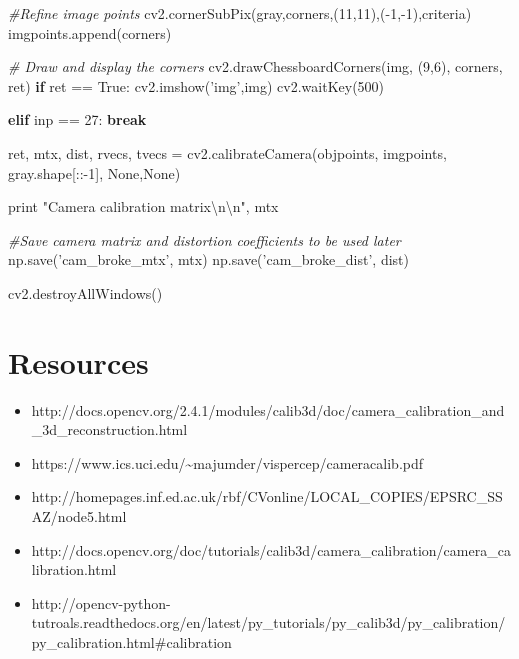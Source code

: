 \documentclass[]{article}
\newenvironment{Shaded}{}{}
\newcommand{\DecValTok}[1]{\textcolor[rgb]{0.25,0.63,0.44}{{#1}}}
\newcommand{\CharTok}[1]{\textcolor[rgb]{0.25,0.44,0.63}{{#1}}}
\newcommand{\StringTok}[1]{\textcolor[rgb]{0.25,0.44,0.63}{{#1}}}
\newcommand{\CommentTok}[1]{\textcolor[rgb]{0.38,0.63,0.69}{\textit{{#1}}}}
\newcommand{\VariableTok}[1]{\textcolor[rgb]{0.10,0.09,0.49}{{#1}}}
\newcommand{\ControlFlowTok}[1]{\textcolor[rgb]{0.00,0.44,0.13}{\textbf{{#1}}}}
\newcommand{\OperatorTok}[1]{\textcolor[rgb]{0.40,0.40,0.40}{{#1}}}
\newcommand{\BuiltInTok}[1]{{#1}}
\newcommand{\NormalTok}[1]{{#1}}
\providecommand{\tightlist}{%
  \setlength{\itemsep}{0pt}\setlength{\parskip}{0pt}}
\begin{document}
\begin{Shaded}
\begin{Highlighting}[]
            \CommentTok{#Refine image points}
            \NormalTok{cv2.cornerSubPix(gray,corners,(}\DecValTok{11}\NormalTok{,}\DecValTok{11}\NormalTok{),(}\OperatorTok{-}\DecValTok{1}\NormalTok{,}\OperatorTok{-}\DecValTok{1}\NormalTok{),criteria)}
            \NormalTok{imgpoints.append(corners)}

            \CommentTok{# Draw and display the corners}
            \NormalTok{cv2.drawChessboardCorners(img, (}\DecValTok{9}\NormalTok{,}\DecValTok{6}\NormalTok{), corners, ret)}
            \ControlFlowTok{if} \NormalTok{ret }\OperatorTok{==} \VariableTok{True}\NormalTok{:}
                \NormalTok{cv2.imshow(}\StringTok{'img'}\NormalTok{,img)}
                \NormalTok{cv2.waitKey(}\DecValTok{500}\NormalTok{)}

    \ControlFlowTok{elif} \NormalTok{inp }\OperatorTok{==} \DecValTok{27}\NormalTok{: }\ControlFlowTok{break}


\NormalTok{ret, mtx, dist, rvecs, tvecs }\OperatorTok{=} \NormalTok{cv2.calibrateCamera(objpoints,}
                                                   \NormalTok{imgpoints, gray.shape[::}\OperatorTok{-}\DecValTok{1}\NormalTok{],}
                                                   \VariableTok{None}\NormalTok{,}\VariableTok{None}\NormalTok{)}



\BuiltInTok{print} \StringTok{"Camera calibration matrix}\CharTok{\textbackslash{}n\textbackslash{}n}\StringTok{"}\NormalTok{, mtx}

\CommentTok{#Save camera matrix and distortion coefficients to be used later}
\NormalTok{np.save(}\StringTok{'cam_broke_mtx'}\NormalTok{, mtx)}
\NormalTok{np.save(}\StringTok{'cam_broke_dist'}\NormalTok{, dist)}

\NormalTok{cv2.destroyAllWindows()}
\end{Highlighting}
\end{Shaded}

\section{Resources}\label{resources}

\begin{itemize}
\tightlist
\item
  http://docs.opencv.org/2.4.1/modules/calib3d/doc/camera\_calibration\_and\_3d\_reconstruction.html
\item
  https://www.ics.uci.edu/\textasciitilde{}majumder/vispercep/cameracalib.pdf
\item
  http://homepages.inf.ed.ac.uk/rbf/CVonline/LOCAL\_COPIES/EPSRC\_SSAZ/node5.html
\item
  http://docs.opencv.org/doc/tutorials/calib3d/camera\_calibration/camera\_calibration.html
\item
  http://opencv-python-tutroals.readthedocs.org/en/latest/py\_tutorials/py\_calib3d/py\_calibration/py\_calibration.html\#calibration
\end{itemize}
\end{document}
